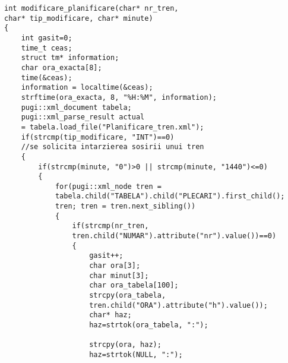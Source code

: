 \documentclass[runningheads]{llncs}
\begin{document}
\begin{verbatim}
int modificare_planificare(char* nr_tren, 
char* tip_modificare, char* minute)
{
    int gasit=0;
    time_t ceas;
    struct tm* information;
    char ora_exacta[8];
    time(&ceas);
    information = localtime(&ceas);
    strftime(ora_exacta, 8, "%H:%M", information);
    pugi::xml_document tabela;
    pugi::xml_parse_result actual 
    = tabela.load_file("Planificare_tren.xml");
    if(strcmp(tip_modificare, "INT")==0)
    //se solicita intarzierea sosirii unui tren
    {
        if(strcmp(minute, "0")>0 || strcmp(minute, "1440")<=0)
        {
            for(pugi::xml_node tren = 
            tabela.child("TABELA").child("PLECARI").first_child(); 
            tren; tren = tren.next_sibling())
            {
                if(strcmp(nr_tren, 
                tren.child("NUMAR").attribute("nr").value())==0)
                {
                    gasit++;
                    char ora[3];
                    char minut[3];
                    char ora_tabela[100];
                    strcpy(ora_tabela, 
                    tren.child("ORA").attribute("h").value());
                    char* haz;
                    haz=strtok(ora_tabela, ":");

                    strcpy(ora, haz);
                    haz=strtok(NULL, ":");
                    

\end{verbatim}
\end{document}
